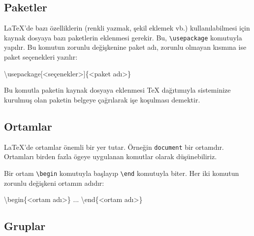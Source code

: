 \documentclass[
  10pt,
]{scrbook}
\newenvironment{Shaded}{\begin{snugshade}}{\end{snugshade}}
\newcommand{\NormalTok}[1]{#1}
\newcommand{\SpecialCharTok}[1]{\textcolor[rgb]{0.00,0.00,0.00}{#1}}
\begin{document}
\hypertarget{paketler}{%
\subsection{Paketler}\label{paketler}}

LaTeX'de bazı özelliklerin (renkli yazmak, şekil eklemek vb.)
kullanılabilmesi için kaynak dosyaya bazı paketlerin eklenmesi gerekir.
Bu, \texttt{\textbackslash{}usepackage} komutuyla yapılır. Bu komutun zorunlu değişkenine
paket adı, zorunlu olmayan kısmına ise paket seçenekleri yazılır:

\begin{Shaded}
\begin{Highlighting}[]
\NormalTok{\textbackslash{}usepackage[}\SpecialCharTok{\textless{}}\NormalTok{seçenekler}\SpecialCharTok{\textgreater{}}\NormalTok{]\{}\SpecialCharTok{\textless{}}\NormalTok{paket adı}\SpecialCharTok{\textgreater{}}\NormalTok{\}}
\end{Highlighting}
\end{Shaded}

Bu komutla paketin kaynak dosyaya eklenmesi TeX dağıtımıyla sisteminize
kurulmuş olan paketin belgeye çağrılarak işe koşulması demektir.

\hypertarget{ortamlar}{%
\subsection{Ortamlar}\label{ortamlar}}

LaTeX'de ortamlar önemli bir yer tutar. Örneğin \texttt{document} bir ortamdır.
Ortamları birden fazla ögeye uygulanan komutlar olarak düşünebiliriz.

Bir ortam \texttt{\textbackslash{}begin} komutuyla başlayıp \texttt{\textbackslash{}end} komutuyla biter. Her iki
komutun zorunlu değişkeni ortamın adıdır:

\begin{Shaded}
\begin{Highlighting}[]
\NormalTok{\textbackslash{}begin\{}\SpecialCharTok{\textless{}}\NormalTok{ortam adı}\SpecialCharTok{\textgreater{}}\NormalTok{\}}
\NormalTok{ ...}
\NormalTok{\textbackslash{}end\{}\SpecialCharTok{\textless{}}\NormalTok{ortam adı}\SpecialCharTok{\textgreater{}}\NormalTok{\}}
\end{Highlighting}
\end{Shaded}

\hypertarget{gruplar}{%
\subsection{Gruplar}\label{gruplar}}
\end{document}
